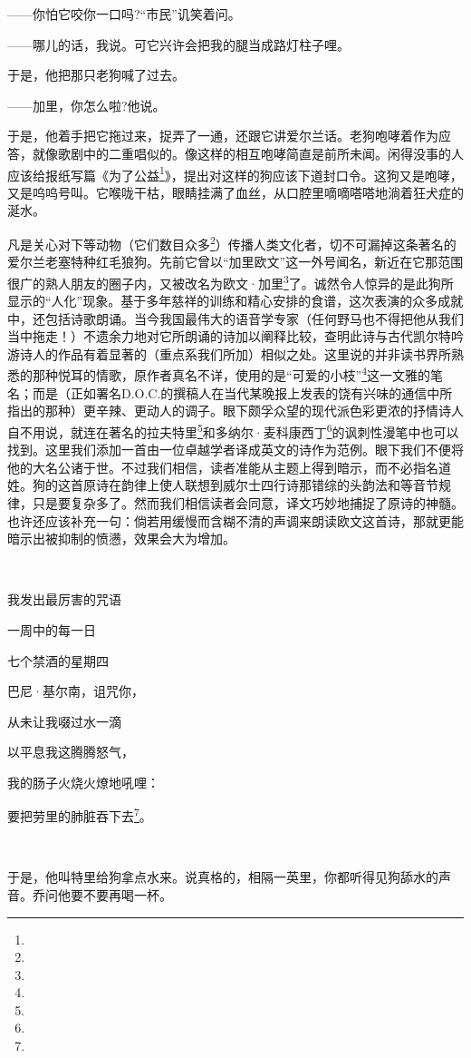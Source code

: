 \par ——你怕它咬你一口吗?“市民”讥笑着问。
\par ——哪儿的话，我说。可它兴许会把我的腿当成路灯柱子哩。
\par 于是，他把那只老狗喊了过去。
\par ——加里，你怎么啦?他说。
\par 于是，他着手把它拖过来，捉弄了一通，还跟它讲爱尔兰话。老狗咆哮着作为应答，就像歌剧中的二重唱似的。像这样的相互咆哮简直是前所未闻。闲得没事的人应该给报纸写篇《为了公益\footnote{}》，提出对这样的狗应该下道封口令。这狗又是咆哮，又是呜呜号叫。它喉咙干枯，眼睛挂满了血丝，从口腔里嘀嘀嗒嗒地淌着狂犬症的涎水。
\par 凡是关心对下等动物（它们数目众多\footnote{}）传播人类文化者，切不可漏掉这条著名的爱尔兰老塞特种红毛狼狗。先前它曾以“加里欧文”这一外号闻名，新近在它那范围很广的熟人朋友的圈子内，又被改名为欧文·加里\footnote{}了。诚然令人惊异的是此狗所显示的“人化”现象。基于多年慈祥的训练和精心安排的食谱，这次表演的众多成就中，还包括诗歌朗诵。当今我国最伟大的语音学专家（任何野马也不得把他从我们当中拖走！）不遗余力地对它所朗诵的诗加以阐释比较，查明此诗与古代凯尔特吟游诗人的作品有着显著的（重点系我们所加）相似之处。这里说的并非读书界所熟悉的那种悦耳的情歌，原作者真名不详，使用的是“可爱的小枝”\footnote{}这一文雅的笔名；而是（正如署名D.O.C.的撰稿人在当代某晚报上发表的饶有兴味的通信中所指出的那种）更辛辣、更动人的调子。眼下颇孚众望的现代派色彩更浓的抒情诗人自不用说，就连在著名的拉夫特里\footnote{}和多纳尔·麦科康西丁\footnote{}的讽刺性漫笔中也可以找到。这里我们添加一首由一位卓越学者译成英文的诗作为范例。眼下我们不便将他的大名公诸于世。不过我们相信，读者准能从主题上得到暗示，而不必指名道姓。狗的这首原诗在韵律上使人联想到威尔士四行诗那错综的头韵法和等音节规律，只是要复杂多了。然而我们相信读者会同意，译文巧妙地捕捉了原诗的神髓。也许还应该补充一句：倘若用缓慢而含糊不清的声调来朗读欧文这首诗，那就更能暗示出被抑制的愤懑，效果会大为增加。
\par  
\par 我发出最厉害的咒语
\par 一周中的每一日
\par 七个禁酒的星期四
\par 巴尼·基尔南，诅咒你，
\par 从未让我啜过水一滴
\par 以平息我这腾腾怒气，
\par 我的肠子火烧火燎地吼哩：
\par 要把劳里的肺脏吞下去\footnote{}。
\par  
\par 于是，他叫特里给狗拿点水来。说真格的，相隔一英里，你都听得见狗舔水的声音。乔问他要不要再喝一杯。
